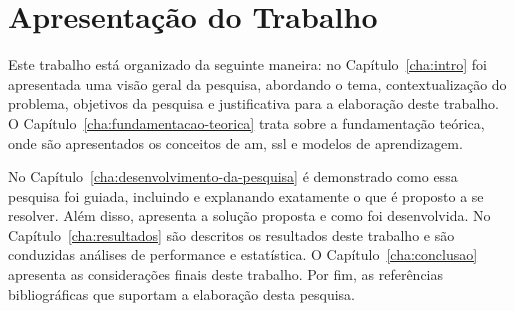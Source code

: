 \section{Apresentação do Trabalho}
    \label{sec:apresentacao-trabalho}
    Este trabalho está organizado da seguinte maneira: no Capítulo~\ref{cha:intro} foi apresentada uma visão geral da pesquisa, abordando o tema, contextualização do problema, objetivos da pesquisa e justificativa para a elaboração deste trabalho. O Capítulo~\ref{cha:fundamentacao-teorica} trata sobre a fundamentação teórica, onde são apresentados os conceitos de \ac{am}, \ac{ssl} e modelos de aprendizagem.
    
    No Capítulo~\ref{cha:desenvolvimento-da-pesquisa} é demonstrado como essa pesquisa foi guiada, incluindo e explanando exatamente o que é proposto a se resolver. Além disso, apresenta a solução proposta e como foi desenvolvida. No Capítulo~\ref{cha:resultados} são descritos os resultados deste trabalho e são conduzidas análises de performance e estatística. O Capítulo~\ref{cha:conclusao} apresenta as considerações finais deste trabalho. Por fim, as referências bibliográficas que suportam a elaboração desta pesquisa.